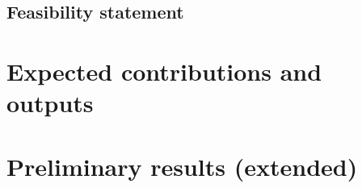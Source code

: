 \documentclass[11pt,a4paper]{article}
\begin{document}
\subsection{Feasibility statement}

\section{Expected contributions and outputs}

\printbibliography
\appendix
\section{Preliminary results (extended)}
\end{document}
